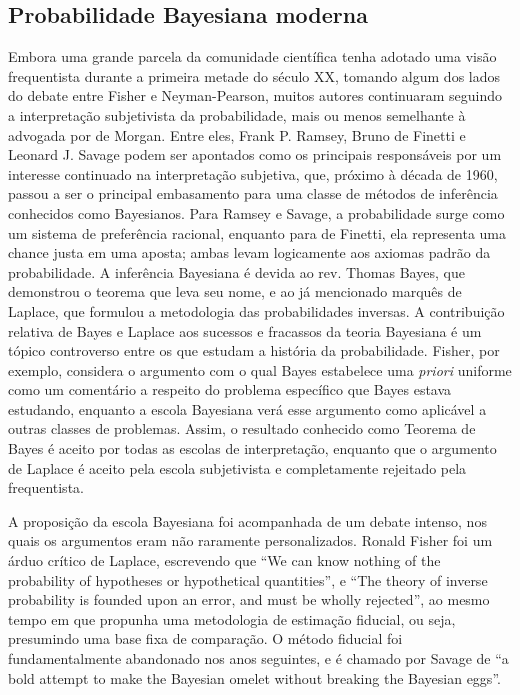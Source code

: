 \documentclass[12pt,a4paper]{article}
\begin{document}
\subsection{Probabilidade Bayesiana moderna}
Embora uma grande parcela da comunidade científica tenha adotado uma visão frequentista durante a primeira metade do século XX,
tomando algum dos lados do debate entre Fisher e Neyman-Pearson, muitos autores continuaram seguindo a interpretação 
subjetivista da probabilidade, mais ou menos semelhante à advogada por de Morgan. Entre eles, Frank P. Ramsey, 
Bruno de Finetti e Leonard J. Savage
podem ser apontados como os principais responsáveis por um interesse continuado na interpretação subjetiva, que, próximo à
década de 1960, passou a ser o principal embasamento para uma classe de métodos de inferência conhecidos como Bayesianos. 
Para Ramsey e Savage, a probabilidade surge como um sistema de preferência racional, enquanto para de Finetti, ela representa
uma chance justa em uma aposta; ambas levam logicamente aos axiomas padrão da probabilidade.
A inferência Bayesiana é devida ao rev. Thomas Bayes, que demonstrou o teorema que leva seu nome, e ao já mencionado marquês de
Laplace, que formulou a metodologia das probabilidades inversas. A contribuição relativa de Bayes e Laplace aos sucessos
e fracassos da teoria Bayesiana é um tópico controverso	entre os que estudam a história da probabilidade\cite{Zabell09}.
Fisher, por exemplo, considera o argumento com o qual Bayes estabelece uma {\em priori} uniforme como um comentário
a respeito do problema específico que Bayes estava estudando, enquanto a escola Bayesiana verá esse argumento
como aplicável a outras classes de problemas\cite{Aldrich08}. Assim, o resultado conhecido como Teorema de Bayes é aceito
por todas as escolas de interpretação, enquanto que o argumento de Laplace 
é aceito pela escola subjetivista e completamente rejeitado pela frequentista. 

A proposição da escola Bayesiana foi acompanhada de um debate intenso, nos quais os argumentos eram não raramente personalizados.
Ronald Fisher foi um árduo crítico
de Laplace, escrevendo que ``We can know nothing of the probability of hypotheses or hypothetical quantities''\cite{Fisher1921},
e ``The theory of inverse probability is founded upon an error, and must be wholly rejected''\cite{Fisher1925}, ao mesmo tempo
em que propunha uma metodologia de estimação fiducial, ou seja, presumindo uma base fixa de comparação. O método fiducial foi
fundamentalmente abandonado nos anos seguintes, e é chamado por Savage de ``a bold attempt to make the Bayesian omelet without
breaking the Bayesian eggs''\cite{Savage60}. 
\end{document}

